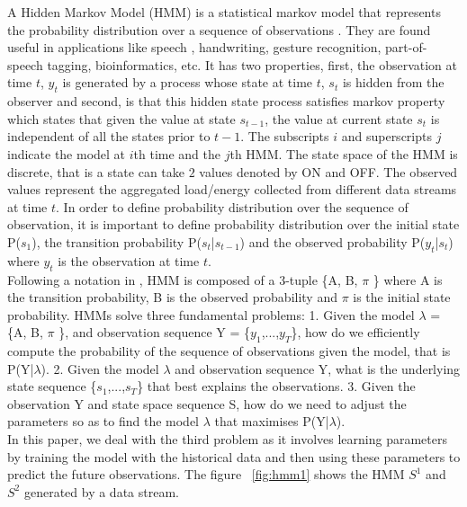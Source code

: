 \documentclass{sig-alternate}
\begin{document}
A Hidden Markov Model (HMM) is a statistical markov model that represents the probability distribution over a sequence of observations \cite{Ghahramani}. They are found useful in applications like speech \cite{Rabiner}, handwriting, gesture recognition, part-of-speech tagging, bioinformatics, etc. It has two properties, first, the observation at time $t$, $y_{t}$ is generated by a process whose state at time $t$, $s_{t}$ is hidden from the observer and second, is that this hidden state process satisfies markov property which states that given the value at state $s_{t-1}$, the value at current state $s_{t}$ is independent of all the states prior to $t-1$. The subscripts $i$ and superscripts $j$ indicate the model at $i$th time and the $j$th HMM. The state space of the HMM is discrete, that is a state can take $2$ values denoted by ON and OFF. The observed values represent the aggregated load/energy collected from different data streams at time $t$. In order to define probability distribution over the sequence of observation, it is important to define probability distribution over the initial state P($s_{1}$), the transition probability P($s_{t}$|$s_{t-1}$) and the observed probability P($y_{t}$|$s_{t}$) where $y_{t}$ is the observation at time $t$. \\
Following a notation in \cite{Rabiner}, HMM is composed of a 3-tuple \{A, B, $\pi$ \} where A is the transition probability, B is the observed probability and $\pi$ is the initial state probability.
HMMs solve three fundamental problems:
1. Given the model $\lambda$ = \{A, B, $\pi$ \}, and observation sequence Y = \{$y_{1}$,...,$y_{T}$\}, how do we efficiently compute the probability of the sequence of observations given the model, that is P(Y|$\lambda$).
2. Given the model $\lambda$ and observation sequence Y, what is the underlying state sequence \{$s_{1}$,...,$s_{T}$\} that best explains the observations.
3. Given the observation Y and state space sequence S, how do we need to adjust the parameters so as to find the model $\lambda$ that maximises P(Y|$\lambda$).\\
In this paper, we deal with the third problem as it involves learning parameters by training the model with the historical data and then using these parameters to predict the future observations.
The figure ~\ref{fig:hmm1} shows the HMM $S^1$ and $S^2$ generated by a data stream.
\end{document}
